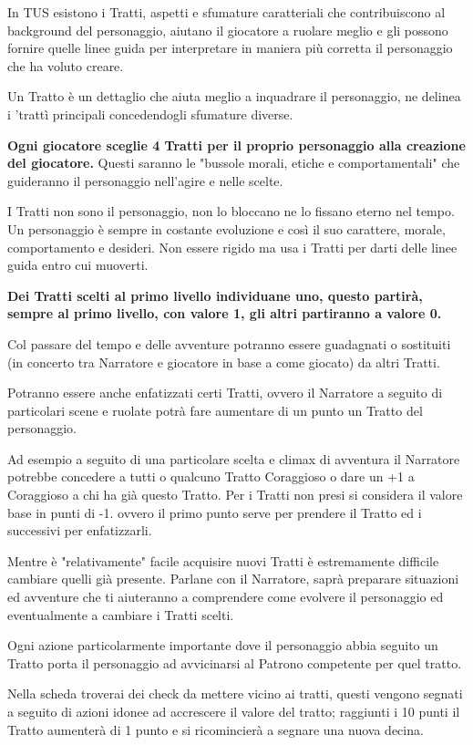 \documentclass[a4paper,11pt,twoside,openany]{book}
\begin{document}
In TUS esistono i Tratti, aspetti e sfumature caratteriali che contribuiscono al background del personaggio, aiutano il giocatore a ruolare meglio e gli possono fornire quelle linee guida per interpretare in maniera più corretta il personaggio che ha voluto creare.

Un Tratto è un dettaglio che aiuta meglio a inquadrare il personaggio, ne delinea i 'trattì principali concedendogli sfumature diverse.

\textbf{Ogni giocatore sceglie 4 Tratti per il proprio personaggio alla creazione del giocatore.} Questi saranno le "bussole morali, etiche e comportamentali" che guideranno il personaggio nell'agire e nelle scelte.

I Tratti non sono il personaggio, non lo bloccano ne lo fissano eterno nel tempo. Un personaggio è sempre in costante evoluzione e così il suo carattere, morale, comportamento e desideri. Non essere rigido ma usa i Tratti per darti delle linee guida entro cui muoverti.

\textbf{Dei Tratti scelti al primo livello individuane uno, questo partirà, sempre al primo livello, con valore 1, gli altri partiranno a valore 0.}

Col passare del tempo e delle avventure potranno essere guadagnati o sostituiti (in concerto tra Narratore e giocatore in base a come giocato) da altri Tratti.

Potranno essere anche enfatizzati certi Tratti, ovvero il Narratore a seguito di particolari scene e ruolate potrà fare aumentare di un punto un Tratto del personaggio.

Ad esempio a seguito di una particolare scelta e climax di avventura il Narratore potrebbe concedere a tutti o qualcuno Tratto Coraggioso o dare un +1 a Coraggioso a chi ha già questo Tratto. Per i Tratti non presi si considera il valore base in punti di -1. ovvero il primo punto serve per prendere il Tratto ed i successivi per enfatizzarli.

Mentre è "relativamente" facile acquisire nuovi Tratti è estremamente difficile cambiare quelli già presente. Parlane con il Narratore, saprà preparare situazioni ed avventure che ti aiuteranno a comprendere come evolvere il personaggio ed eventualmente a cambiare i Tratti scelti.

Ogni azione particolarmente importante dove il personaggio abbia seguito un Tratto porta il personaggio ad avvicinarsi al Patrono competente per quel tratto.

Nella scheda troverai dei check da mettere vicino ai tratti, questi vengono segnati a seguito di azioni idonee ad accrescere il valore del tratto; raggiunti i 10 punti il Tratto aumenterà di 1 punto e si ricomincierà a segnare una nuova decina.
\end{document}

